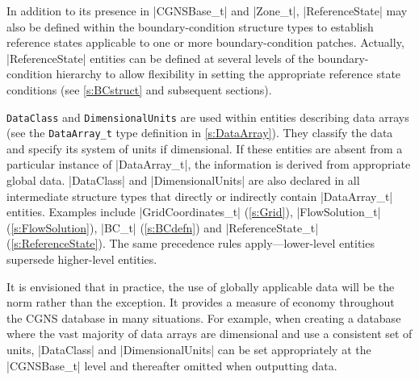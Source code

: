 In addition to its presence in |CGNSBase_t| and |Zone_t|,
|ReferenceState| may also be defined within the boundary-condition
structure types to establish reference states applicable to one or more
boundary-condition patches.  Actually, |ReferenceState| entities can be
defined at several levels of the boundary-condition hierarchy to allow
flexibility in setting the appropriate reference state conditions (see
\autoref{s:BCstruct} and subsequent sections).

\texttt{DataClass} and \texttt{DimensionalUnits} are used within
entities describing data arrays (see the \texttt{DataArray\_t} type
definition in \autoref{s:DataArray}).
They classify the data and specify its system of units if dimensional.  If
these entities are absent from a particular instance of |DataArray_t|, the
information is derived from appropriate global data.  |DataClass| and
|DimensionalUnits| are also declared in all intermediate structure types that
directly or indirectly contain |DataArray_t| entities.  Examples include
|GridCoordinates_t| (\autoref{s:Grid}), |FlowSolution_t|
(\autoref{s:FlowSolution}), |BC_t| (\autoref{s:BCdefn}) and |ReferenceState_t|
(\autoref{s:ReferenceState}).  The same precedence rules apply---lower-level
entities supersede higher-level entities.

It is envisioned that in practice, the use of globally applicable data will
be the norm rather than the exception.  It provides a measure of economy
throughout the CGNS database in many situations.  For example, when creating
a database where the vast majority of data arrays are dimensional and use a
consistent set of units, |DataClass| and |DimensionalUnits| can be set
appropriately at the |CGNSBase_t| level and thereafter omitted when
outputting data.
